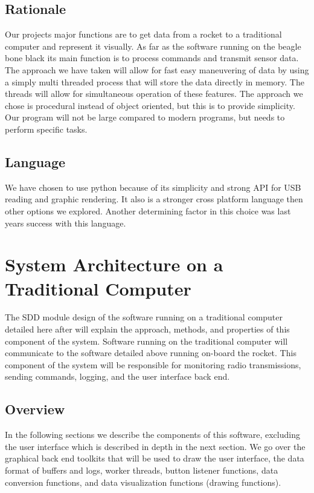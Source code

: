 \documentclass[10pt,draftclsnofoot,onecolumn,compsoc]{IEEEtran}
\begin{document}
\subsection{Rationale}
Our projects major functions are to get data from a rocket to a traditional computer and represent it visually. As far as the software running on the beagle bone black its main function is to process commands and transmit sensor data. The approach we have taken will allow for fast easy maneuvering of data by using a simply multi threaded process that will store the data directly in memory. The threads will allow for simultaneous operation of these features. The approach we chose is procedural instead of object oriented, but this is to provide simplicity. Our program will not be large compared to modern programs, but needs to perform specific tasks.
\subsection{Language}
We have chosen to use python because of its simplicity and strong API for USB reading and graphic rendering. It also is a stronger cross platform language then other options we explored. Another determining factor in this choice was last years success with this language.

\section{System Architecture on a Traditional Computer }
The SDD module design of the software running on a traditional computer detailed here after will explain the approach, methods, and properties of this component of the system. Software running on the traditional computer will communicate to the software detailed above running on-board the rocket. This component of the system will be responsible for monitoring radio transmissions, sending commands, logging, and the user interface back end. \par

\subsection{Overview}
In the following sections we describe the components of this software, excluding the user interface which is described in depth in the next section. We go over the graphical back end toolkits that will be used to draw the user interface, the data format of buffers and logs, worker threads, button listener functions, data conversion functions, and data visualization functions (drawing functions). \par
\end{document}
